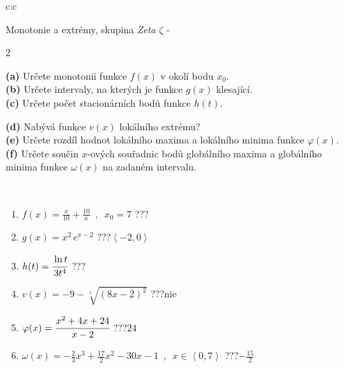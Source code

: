 \documentclass[10pt]{report}
\begin{document}
\newpage
\thispagestyle{empty}
\begin{tabular}{c:c}
\begin{minipage}[c][104.5mm][t]{0.5\linewidth}
\begin{center}
\vspace{7mm}
{\huge Monotonie a extrémy, skupina \textit{Zeta $\zeta$} -}\\[5mm]
\begin{minipage}{0.95\linewidth}
\begin{center}
{\small \begin{multicols}{2} \raggedright
\textbf{(a)} Určete monotonii funkce \(f(x)\) v okolí bodu \(x_0\). \\[1mm]
\textbf{(b)} Určete intervaly, na kterých je funkce \(g(x)\) klesající. \\[1mm]
\textbf{(c)} Určete počet stacionárních bodů funkce \(h(t)\). \par \columnbreak
\textbf{(d)} Nabývá funkce \(v(x)\) lokálního extrému? \\[1mm]
\textbf{(e)} Určete rozdíl hodnot lokálního maxima a lokálního minima funkce \(\varphi(x)\). \\[1mm]
\textbf{(f)} Určete součin \(x\)-ových souřadnic bodů globálního maxima a globálního minima funkce \(\omega(x)\) na zadaném intervalu. \\[1mm]
\end{multicols}
}
\end{center}
\end{minipage}
\\[4mm]
\begin{minipage}{0.79\linewidth}
\begin{center}
\begin{varwidth}{\linewidth}
\begin{enumerate}
\normalsize
\item $f(x)=\frac{x}{10}+\frac{10}{x} \enspace , \enspace x_0=7$\quad \dotfill\; ???\;\dotfill \quad {}
\item $g(x)=x^2\, e^{x-2}$\quad \dotfill\; ???\;\dotfill \quad $\left\langle-2 , 0\right\rangle$
\item $h(t)=\cfrac{\ln t}{3t^4}$\quad \dotfill\; ???\;\dotfill {}
\item $v(x)=-9-\sqrt[5]{(8x-2)^2}$\quad \dotfill\; ???\;\dotfill \quad $\text{nie}$
\item $\varphi(x)=\cfrac{x^2+4x+24}{x-2}$\quad \dotfill\; ???\;\dotfill \quad $24$
\item $\omega(x)=-\frac{2}{3}x^3+\frac{17}{2}x^2-30x-1 \enspace , \enspace x\in\left\langle0 , 7\right\rangle$\quad \dotfill\; ???\;\dotfill \quad $-\frac{15}{2}$

\end{enumerate}
\end{varwidth}
\end{center}
\end{minipage}
\end{center}
\end{minipage}
\end{tabular}
\end{document}
